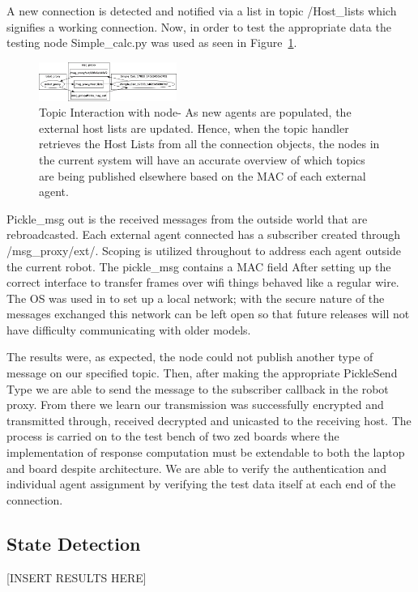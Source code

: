 \documentclass[conference]{IEEEtran}
\begin{document}
A new connection is detected and notified via a list in topic /Host\_lists which signifies a working connection. Now, in order to test the appropriate data the testing node Simple\_calc.py was used as seen in Figure~\ref{fig:TopicIntr2}.

\begin{figure}[]
\centering
\includegraphics[width=0.4\textwidth]{TopicIntr2}
\caption{Topic Interaction with node- As new agents are populated, the external host lists are updated. Hence, when the topic handler retrieves the Host Lists from all the connection objects, the nodes in the current system will have an accurate overview of which topics are being published elsewhere based on the MAC of each external agent.}
\label{fig:TopicIntr2}
\end{figure}

Pickle\_msg out is the received messages from the outside world that are rebroadcasted. Each external agent connected has a subscriber created through /msg\_proxy/ext/. Scoping is utilized throughout to address each agent outside the current robot. The pickle\_msg contains a MAC field After setting up the correct interface to transfer frames over wifi things behaved like a regular wire. The OS was used in to set up a local network; with the secure nature of the messages exchanged this network can be left open so that future releases will not have difficulty communicating with older models. 

The results were, as expected, the node could not publish another type of message on our specified topic. Then, after making the appropriate PickleSend Type we are able to send the message to the subscriber callback in the robot proxy. From there we learn our transmission was successfully encrypted and transmitted through, received decrypted and unicasted to the receiving host. The process is carried on to the test bench of two zed boards where the implementation of response computation must be extendable to both the laptop and board despite architecture. We are able to verify the authentication and individual agent assignment by verifying the test data itself at each end of the connection.

\subsection{State Detection}
[INSERT RESULTS HERE]
\end{document}

